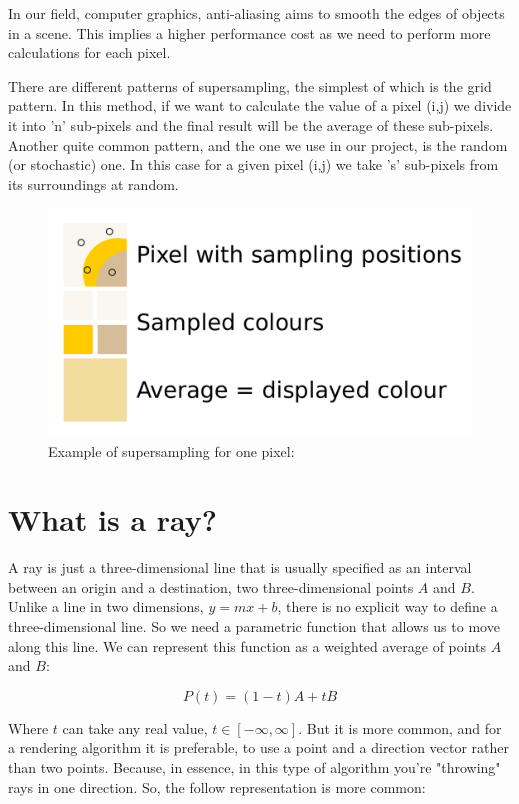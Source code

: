 \documentclass[titlepage,12pt]{report}
\begin{document}
In our field, computer graphics, anti-aliasing aims to smooth the edges of objects in a scene. This implies a higher performance cost as we need to perform more calculations for each pixel.

There are different patterns of supersampling, the simplest of which is the grid pattern. In this method, if we want to calculate the value of a pixel (i,j) we divide it into 'n' sub-pixels and the final result will be the average of these sub-pixels. Another quite common pattern, and the one we use in our project, is the random (or stochastic) one. In this case for a given pixel (i,j) we take 's' sub-pixels from its surroundings at random.

\begin{figure}[!ht]
	\centering
	\includegraphics[scale=0.20]{media/Supersampling.png}
	\caption{Example of supersampling for one pixel: \citep{Kurt2010}}
	\label{SA}
\end{figure}

\section{What is a ray?}

A ray is just a three-dimensional line that is usually specified as an interval between an origin and a destination, two three-dimensional points $A$ and $B$. Unlike a line in two dimensions, $y = m x + b$, there is no explicit way to define a three-dimensional line. So we need a parametric function that allows us to move along this line. We can represent this function as a weighted average of points $A$ and $B$:

\begin{equation}
P(t) = (1-t)A + tB
\end{equation}

Where $t$ can take any real value, $t \in [-\infty, \infty]$. But it is more common, and for a rendering algorithm it is preferable, to use a point and a direction vector rather than two points. Because, in essence, in this type of algorithm you're "throwing" rays in one direction. So, the follow representation is more common:
\end{document}
